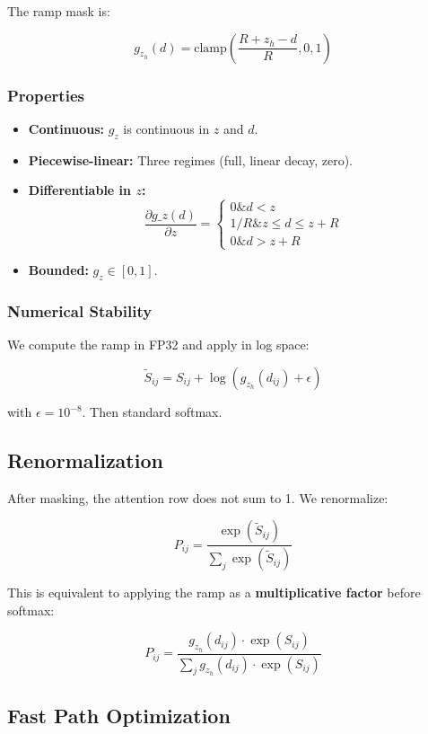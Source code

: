 The ramp mask is:

\[
g_{z_h}(d) = \text{clamp}\!\left(\frac{R + z_h - d}{R}, 0, 1\right)
\]

\subsubsection{Properties}

\begin{itemize}
\item \textbf{Continuous:} $g_z$ is continuous in $z$ and $d$.
\item \textbf{Piecewise-linear:} Three regimes (full, linear decay, zero).
\item \textbf{Differentiable in $z$:}
  \[
\frac{\partial g\_z(d)}{\partial z} = \begin{cases} 0 \& d < z \\ 1/R \& z \le d \le z + R \\ 0 \& d > z + R \end{cases}
\]
\item \textbf{Bounded:} $g_z \in [0, 1]$.

\end{itemize}
\subsubsection{Numerical Stability}

We compute the ramp in FP32 and apply in log space:

\[
\tilde{S}_{ij} = S_{ij} + \log(g_{z_h}(d_{ij}) + \epsilon)
\]

with $\epsilon = 10^{-8}$. Then standard softmax.

\subsection{Renormalization}

After masking, the attention row does not sum to 1. We renormalize:

\[
P_{ij} = \frac{\exp(\tilde{S}_{ij})}{\sum_j \exp(\tilde{S}_{ij})}
\]

This is equivalent to applying the ramp as a \textbf{multiplicative factor} before 
softmax:

\[
P_{ij} = \frac{g_{z_h}(d_{ij}) \cdot \exp(S_{ij})}{\sum_j g_{z_h}(d_{ij}) \cdot \exp(S_{ij})}
\]

\subsection{Fast Path Optimization}

